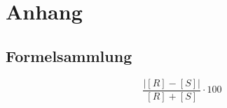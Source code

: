 

\listoffigures
\listoftables

\section{Anhang}

\subsection{Formelsammlung}

\begin{equation}
    \frac{| [R]-[S] |}{[R]+[S]} \cdot 100
\end{equation}
